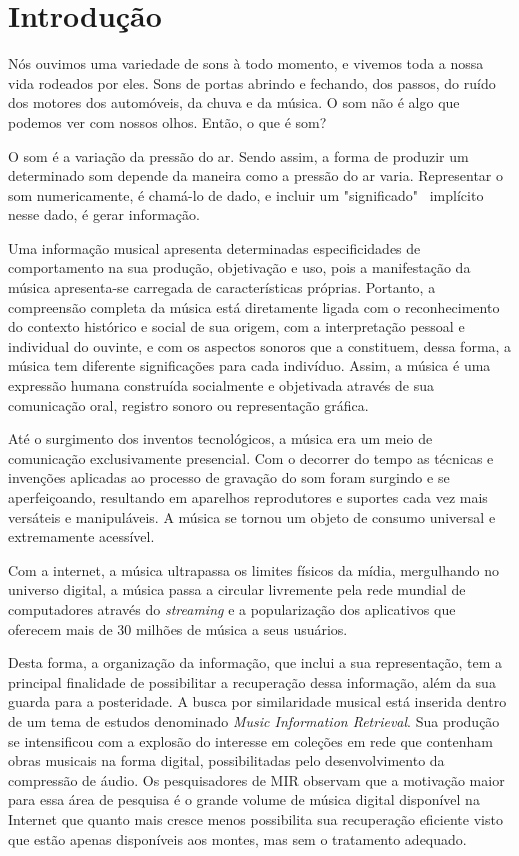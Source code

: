 \chapter{Introdução}
Nós ouvimos uma variedade de sons à todo momento, e vivemos toda a nossa vida rodeados por eles. Sons de portas abrindo e fechando, dos passos, do ruído dos motores dos automóveis, da chuva e da música. O som não é algo que podemos ver com nossos olhos. Então, o que é som?

O som é a variação da pressão do ar. Sendo assim, a forma de produzir um determinado som depende da maneira como a pressão do ar varia. Representar o som numericamente, é chamá-lo de dado, e incluir um "significado" \ implícito nesse dado, é gerar informação.

Uma informação musical apresenta determinadas especificidades de comportamento na sua produção, objetivação e uso, pois a manifestação da música apresenta-se carregada de características próprias. Portanto, a compreensão completa da música está diretamente ligada com o reconhecimento do contexto histórico e social de sua origem, com a interpretação pessoal e individual do ouvinte, e com os aspectos sonoros que a constituem, dessa forma, a música tem diferente significações para cada indivíduo. Assim, a música é uma expressão humana construída socialmente e objetivada através de sua comunicação oral, registro sonoro ou representação gráfica.

Até o surgimento dos inventos tecnológicos, a música era um meio de comunicação exclusivamente presencial. Com o decorrer do tempo as técnicas e invenções aplicadas ao processo de gravação do som foram surgindo e se aperfeiçoando, resultando em aparelhos reprodutores e suportes cada vez mais versáteis e manipuláveis. A música se tornou um objeto de consumo universal e extremamente acessível.

Com a internet, a música ultrapassa os limites físicos da mídia, mergulhando no universo digital, a música passa a circular livremente pela rede mundial de computadores através do \textit{streaming} e a popularização dos aplicativos que oferecem mais de 30 milhões de música a seus usuários.

Desta forma, a organização da informação, que inclui a sua representação, tem a principal finalidade de possibilitar a recuperação dessa informação, além da sua guarda para a posteridade. A busca por similaridade musical está inserida dentro de um tema de estudos denominado \textit{Music Information Retrieval}. Sua produção se intensificou com a explosão do interesse em coleções em rede que contenham obras musicais na forma digital, possibilitadas pelo desenvolvimento da compressão de áudio. Os pesquisadores de MIR observam que a motivação maior para essa área de pesquisa é o grande volume de música digital disponível na Internet que quanto mais cresce menos possibilita sua recuperação eficiente visto que estão apenas disponíveis aos montes, mas sem o tratamento adequado.

